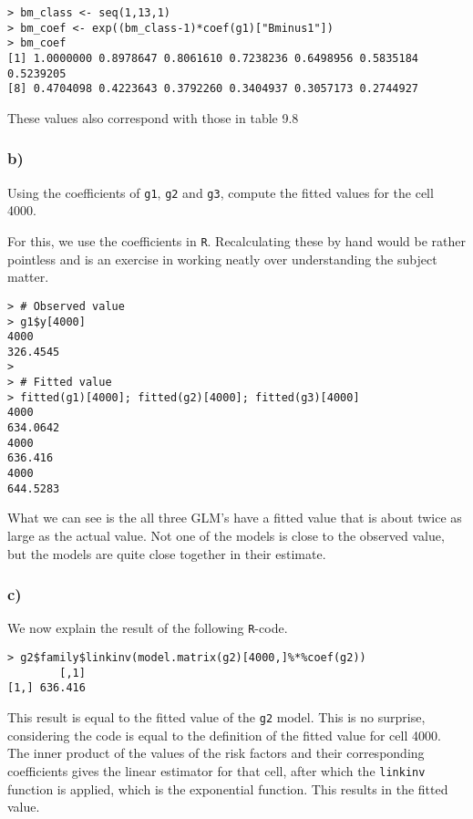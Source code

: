 \documentclass[11pt]{article}
\begin{document}
\begin{verbatim}
> bm_class <- seq(1,13,1)
> bm_coef <- exp((bm_class-1)*coef(g1)["Bminus1"])
> bm_coef
[1] 1.0000000 0.8978647 0.8061610 0.7238236 0.6498956 0.5835184 0.5239205
[8] 0.4704098 0.4223643 0.3792260 0.3404937 0.3057173 0.2744927
\end{verbatim}

These values also correspond with those in table 9.8

\subsubsection*{b)}
Using the coefficients of \verb|g1|, \verb|g2| and \verb|g3|, compute the fitted values for the cell 4000.

For this, we use the coefficients in \verb|R|. Recalculating these by hand would be rather pointless and is an exercise in working neatly over understanding the subject matter.

\begin{verbatim}
> # Observed value
> g1$y[4000]
4000 
326.4545 
> 
> # Fitted value
> fitted(g1)[4000]; fitted(g2)[4000]; fitted(g3)[4000]
4000 
634.0642 
4000 
636.416 
4000 
644.5283 
\end{verbatim}

What we can see is the all three GLM's have a fitted value that is about twice as large as the actual value. Not one of the models is close to the observed value, but the models are quite close together in their estimate.

\subsubsection*{c)}

We now explain the result of the following \verb|R|-code.

\begin{verbatim}
> g2$family$linkinv(model.matrix(g2)[4000,]%*%coef(g2))
        [,1]
[1,] 636.416
\end{verbatim}

This result is equal to the fitted value of the \verb|g2| model. This is no surprise, considering the code is equal to the definition of the fitted value for cell 4000. The inner product of the values of the risk factors and their corresponding coefficients gives the linear estimator for that cell, after which the \verb|linkinv| function is applied, which is the exponential function. This results in the fitted value.
\end{document}
